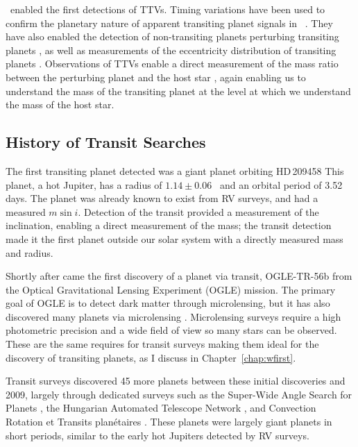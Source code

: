 \kep\ enabled the first detections of TTVs. 
Timing variations have been used to confirm the planetary nature of apparent transiting
planet signals in \kep\ \citep{Holman10, Rowe14}.
They have also enabled the detection of non-transiting planets perturbing transiting
planets \citep[e.g.][]{Ballard11, Nesvorny13}, as well as measurements of the eccentricity 
distribution of transiting planets \citep{Hadden14}.
Observations of TTVs enable a direct measurement of the mass ratio between the
perturbing planet and the host star \citep{Agol05, LithwickWu12},
again enabling us to understand the mass of the transiting planet at the level 
at which we understand the mass of the host star.
 


\subsection{History of Transit Searches}
The first transiting planet detected was a giant planet orbiting HD\,209458 
\citep{Charbonneau00, Henry00}
This planet, a hot Jupiter, has a radius of $1.14 \pm 0.06$ \rsun\ and an orbital 
period of 3.52 days.
The planet was already known to exist from RV surveys, and had a measured $m \sin i$.
Detection of the transit provided a measurement of the inclination, enabling a 
direct measurement of the mass; the transit detection made it the first planet outside our solar system with a directly measured mass and radius.

Shortly after came the first discovery of a planet via transit, OGLE-TR-56b \citep{Udalski02} from the Optical Gravitational Lensing Experiment (OGLE) mission.
The primary goal of OGLE is to detect dark matter through microlensing, but it has also discovered 
many planets via microlensing \citep{Sumi11, Cassan12}.
Microlensing surveys require a high photometric precision and a wide field of view so many stars can be
observed. These are the same requires for transit surveys making them ideal for the discovery of transiting planets, as 
I discuss in Chapter~\ref{chap:wfirst}.

Transit surveys discovered 45 more planets between these initial discoveries and 2009, largely through dedicated surveys such as the Super-Wide Angle Search for Planets \citep[SuperWASP,][]{Street03}, the Hungarian Automated Telescope Network 
\citep[HATNet,][]{Bakos02}, and
Convection Rotation et Transits plan\'{e}taires \citep[CoRoT,][]{Auvergne09}.
These planets were largely giant planets in short periods, similar to the early hot Jupiters
detected by RV surveys. 

